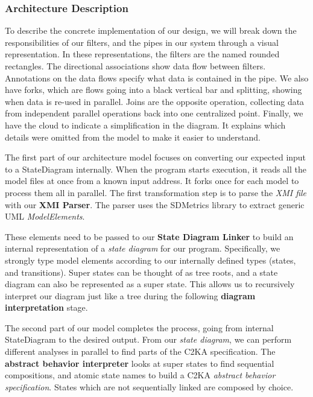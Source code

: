 \documentclass[11pt]{article}
\begin{document}
    \subsubsection{Architecture Description}\label{subsubsec:arch-desc}
    To describe the concrete implementation of our design,
    we will break down the responsibilities of our filters, and the pipes in our system through a visual representation.
    In these representations, the filters are the named rounded rectangles.
    The directional associations show data flow between filters.
    Annotations on the data flows specify what data is contained in the pipe.
    We also have forks, which are flows going into a black vertical bar and splitting, showing when data is re-used in parallel.
    Joins are the opposite operation, collecting data from independent parallel operations back into one centralized point.
    Finally, we have the cloud to indicate a simplification in the diagram.
    It explains which details were omitted from the model to make it easier to understand.

    The first part of our architecture model focuses on converting our expected input to a StateDiagram internally.
    When the program starts execution, it reads all the model files at once from a known input address.
    It forks once for each model to process them all in parallel.
    The first transformation step is to parse the \textit{XMI file} with our \textbf{XMI Parser}.
    The parser uses the SDMetrics library to extract generic UML \textit{ModelElements}.

    These elements need to be passed to our \textbf{State Diagram Linker}
    to build an internal representation of a \textit{state diagram} for our program.
    Specifically, we strongly type model elements according to our internally defined types (states, and transitions).
    Super states can be thought of as tree roots, and a state diagram can also be represented as a super state.
    This allows us to recursively interpret our diagram just like a tree during the following \textbf{diagram interpretation} stage.

    The second part of our model completes the process, going from internal StateDiagram to the desired output.
    From our \textit{state diagram}, we can perform different analyses in parallel to find parts of the C2KA specification.
    The \textbf{abstract behavior interpreter} looks at super states to find sequential compositions,
    and atomic state names to build a C2KA \textit{abstract behavior specification}.
    States which are not sequentially linked are composed by choice.
\end{document}
